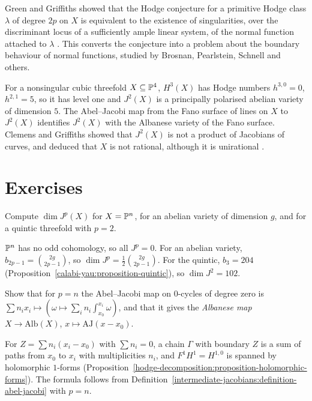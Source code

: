 \begin{remark}\label{intermediate-jacobians:remark-green-griffiths}
Green and Griffiths showed that the Hodge conjecture for a primitive Hodge class $\lambda$ of degree $2p$ on $X$ is equivalent to the existence of singularities, over the discriminant locus of a
sufficiently ample linear system, of the normal function attached to $\lambda$ \cite{green-griffiths-2007}. This converts the conjecture into a problem about the boundary behaviour of normal
functions, studied by Brosnan, Pearlstein, Schnell and others.
\end{remark}

\begin{example}\label{intermediate-jacobians:example-cubic-threefold}
For a nonsingular cubic threefold $X \subseteq \mathbb{P}^4$, $H^3(X)$ has Hodge numbers $h^{3,0} = 0$, $h^{2,1} = 5$, so it has level one and $J^2(X)$ is a principally polarised abelian variety of
dimension $5$. The Abel--Jacobi map from the Fano surface of lines on $X$ to $J^2(X)$ identifies $J^2(X)$ with the Albanese variety of the Fano surface. Clemens and Griffiths showed that
$J^2(X)$ is not a product of Jacobians of curves, and deduced that $X$ is not rational, although it is unirational \cite{clemens-griffiths-1972}.
\end{example}

\section{Exercises}\label{intermediate-jacobians:section-exercises}

\begin{exercise}\label{intermediate-jacobians:exercise-dimension}
Compute $\dim J^p(X)$ for $X = \mathbb{P}^n$, for an abelian variety of dimension $g$, and for a quintic threefold with $p = 2$.
\end{exercise}

\begin{solution}
$\mathbb{P}^n$ has no odd cohomology, so all $J^p = 0$. For an abelian variety, $b_{2p-1} = \binom{2g}{2p-1}$, so $\dim J^p = \frac12\binom{2g}{2p-1}$. For the quintic, $b_3 = 204$
(Proposition~\ref{calabi-yau:proposition-quintic}), so $\dim J^2 = 102$.
\end{solution}

\begin{exercise}\label{intermediate-jacobians:exercise-aj-points}
Show that for $p = n$ the Abel--Jacobi map on $0$-cycles of degree zero is $\sum n_ix_i \mapsto (\omega \mapsto \sum_in_i\int_{x_0}^{x_i}\omega)$, and that it gives the \emph{Albanese map}
$X \to \mathrm{Alb}(X)$, $x \mapsto \mathrm{AJ}(x - x_0)$.
\end{exercise}

\begin{solution}
For $Z = \sum n_i(x_i - x_0)$ with $\sum n_i = 0$, a chain $\Gamma$ with boundary $Z$ is a sum of paths from $x_0$ to $x_i$ with multiplicities $n_i$, and $F^1H^1 = H^{1,0}$ is spanned by holomorphic
$1$-forms (Proposition~\ref{hodge-decomposition:proposition-holomorphic-forms}). The formula follows from Definition~\ref{intermediate-jacobians:definition-abel-jacobi} with $p = n$.
\end{solution}
